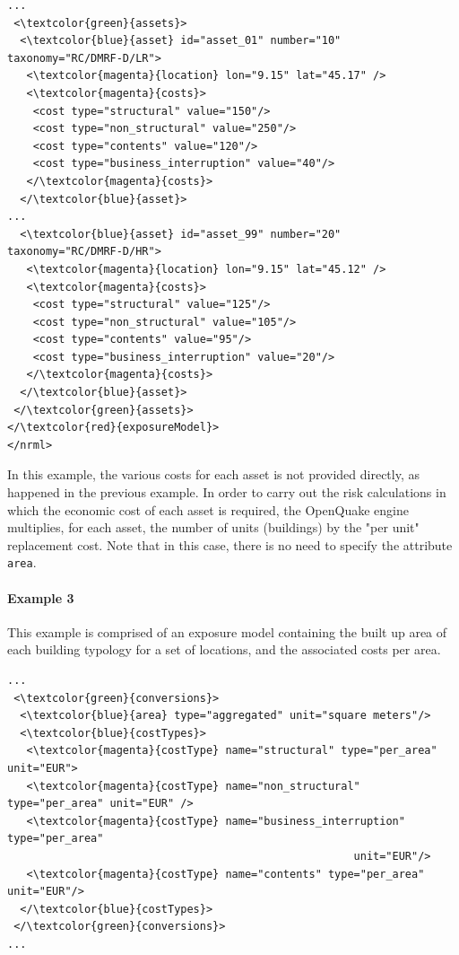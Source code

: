 \begin{Verbatim}[frame=single, commandchars=\\\{\}, samepage=false]
...
 <\textcolor{green}{assets}>
  <\textcolor{blue}{asset} id="asset_01" number="10" taxonomy="RC/DMRF-D/LR">
   <\textcolor{magenta}{location} lon="9.15" lat="45.17" />
   <\textcolor{magenta}{costs}>
    <cost type="structural" value="150"/>
    <cost type="non_structural" value="250"/>
    <cost type="contents" value="120"/>
    <cost type="business_interruption" value="40"/>
   </\textcolor{magenta}{costs}>
  </\textcolor{blue}{asset}>
...
  <\textcolor{blue}{asset} id="asset_99" number="20" taxonomy="RC/DMRF-D/HR">
   <\textcolor{magenta}{location} lon="9.15" lat="45.12" />
   <\textcolor{magenta}{costs}>
    <cost type="structural" value="125"/>
    <cost type="non_structural" value="105"/>
    <cost type="contents" value="95"/>
    <cost type="business_interruption" value="20"/>
   </\textcolor{magenta}{costs}>
  </\textcolor{blue}{asset}>
 </\textcolor{green}{assets}>
</\textcolor{red}{exposureModel}>
</nrml>
\end{Verbatim}

In this example, the various costs for each asset is not provided directly, as happened in the previous example. In order to carry out the risk calculations in which the economic cost of each asset is required, the OpenQuake engine multiplies, for each asset, the number of units (buildings) by the "per unit" replacement cost. Note that in this case, there is no need to specify the attribute \Verb+area+. 

\paragraph{Example 3}
This example is comprised of an \gls{exposure model} containing the built up area of each building typology for a set of locations, and the associated costs per area.

\begin{Verbatim}[frame=single, commandchars=\\\{\}, samepage=false]
...
 <\textcolor{green}{conversions}>
  <\textcolor{blue}{area} type="aggregated" unit="square meters"/>
  <\textcolor{blue}{costTypes}>
   <\textcolor{magenta}{costType} name="structural" type="per_area" unit="EUR">
   <\textcolor{magenta}{costType} name="non_structural" type="per_area" unit="EUR" />
   <\textcolor{magenta}{costType} name="business_interruption" type="per_area" 
                                                      unit="EUR"/>
   <\textcolor{magenta}{costType} name="contents" type="per_area" unit="EUR"/>
  </\textcolor{blue}{costTypes}>
 </\textcolor{green}{conversions}>
...
\end{Verbatim}

